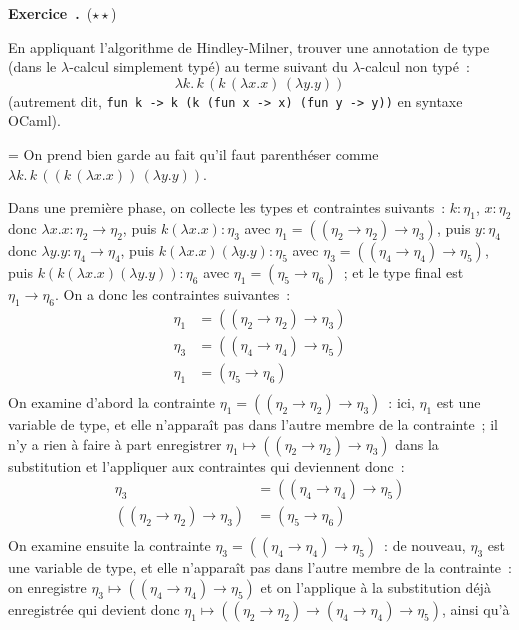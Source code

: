 \documentclass[12pt,a4paper]{article}
\theoremstyle{definition}
\newcommand\exercice{%
\refstepcounter{comcnt}\bigskip\noindent\textbf{Exercice~\thecomcnt.}}
\newif\ifcorrige
\newenvironment{corrige}%
{\ifcorrige\relax\else\setbox0=\vbox\bgroup\fi%
\smallbreak\footnotesize\noindent{\underbar{\textit{Corrigé.}}\quad}}
{{\hbox{}\nobreak\hfill\checkmark}%
\ifcorrige\relax\else\egroup\fi\par}
\begin{document}
%

\exercice\ (${\star}{\star}$)\par\nobreak

En appliquant l'algorithme de Hindley-Milner, trouver une annotation
de type (dans le $\lambda$-calcul simplement typé) au terme suivant du
$\lambda$-calcul non typé :
\[
\lambda k. \, k\,(k\,(\lambda x.x)\,(\lambda y.y))
\]
(autrement dit, \texttt{fun k -> k (k (fun x -> x) (fun y -> y))} en
syntaxe OCaml).

\begin{corrige}
On prend bien garde au fait qu'il faut parenthéser comme $\lambda
k. \, k\,((k\,(\lambda x.x))\,(\lambda y.y))$.

Dans une première phase, on collecte les types et contraintes
suivants : $k:\eta_1$, $x:\eta_2$ donc $\lambda x.x:\eta_2\to\eta_2$,
puis $k(\lambda x.x):\eta_3$ avec $\eta_1 =
((\eta_2\to\eta_2)\to\eta_3)$, puis $y:\eta_4$ donc $\lambda
y.y:\eta_4\to\eta_4$, puis $k(\lambda x.x)(\lambda y.y):\eta_5$ avec
$\eta_3 = ((\eta_4\to\eta_4)\to\eta_5)$, puis $k(k(\lambda
x.x)(\lambda y.y)) : \eta_6$ avec $\eta_1 = (\eta_5\to\eta_6)$ ; et le
type final est $\eta_1 \to \eta_6$.  On a donc les contraintes
suivantes :
\[
\begin{aligned}
\eta_1 &= ((\eta_2\to\eta_2)\to\eta_3)\\
\eta_3 &= ((\eta_4\to\eta_4)\to\eta_5)\\
\eta_1 &= (\eta_5\to\eta_6)\\
\end{aligned}
\]
On examine d'abord la contrainte $\eta_1 =
((\eta_2\to\eta_2)\to\eta_3)$ : ici, $\eta_1$ est une variable de
type, et elle n'apparaît pas dans l'autre membre de la contrainte ; il
n'y a rien à faire à part enregistrer $\eta_1 \mapsto
((\eta_2\to\eta_2)\to\eta_3)$ dans la substitution et l'appliquer aux
contraintes qui deviennent donc :
\[
\begin{aligned}
\eta_3 &= ((\eta_4\to\eta_4)\to\eta_5)\\
((\eta_2\to\eta_2)\to\eta_3) &= (\eta_5\to\eta_6)\\
\end{aligned}
\]
On examine ensuite la contrainte $\eta_3 =
((\eta_4\to\eta_4)\to\eta_5)$ : de nouveau, $\eta_3$ est une variable
de type, et elle n'apparaît pas dans l'autre membre de la contrainte :
on enregistre $\eta_3 \mapsto ((\eta_4\to\eta_4)\to\eta_5)$ et on
l'applique à la substitution déjà enregistrée qui devient donc $\eta_1
\mapsto ((\eta_2\to\eta_2)\to(\eta_4\to\eta_4)\to\eta_5)$, ainsi qu'à

\end{corrige}
\end{document}
